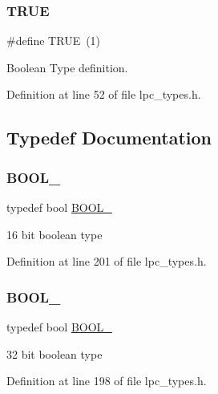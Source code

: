\subsubsection{\texorpdfstring{T\+R\+UE}{TRUE}}
{\footnotesize\ttfamily \#define T\+R\+UE~(1)}



Boolean Type definition. 



Definition at line 52 of file lpc\+\_\+types.\+h.



\subsection{Typedef Documentation}
\mbox{\label{group___l_p_c___types___public___types_ga586a49bf86982ab05295515d1e4e35fe}} 
\subsubsection{\texorpdfstring{B\+O\+O\+L\+\_}{BOOL\_16}}
{\footnotesize\ttfamily typedef bool \hyperlink{group___l_p_c___types___public___types_ga586a49bf86982ab05295515d1e4e35fe}{B\+O\+O\+L\+\_}}

16 bit boolean type 

Definition at line 201 of file lpc\+\_\+types.\+h.

\mbox{\label{group___l_p_c___types___public___types_gab02ba567b91b6b3d3c0c0209b2f577a0}} 
\subsubsection{\texorpdfstring{B\+O\+O\+L\+\_}{BOOL\_32}}
{\footnotesize\ttfamily typedef bool \hyperlink{group___l_p_c___types___public___types_gab02ba567b91b6b3d3c0c0209b2f577a0}{B\+O\+O\+L\+\_}}

32 bit boolean type 

Definition at line 198 of file lpc\+\_\+types.\+h.

